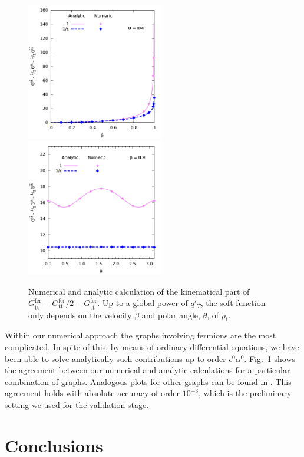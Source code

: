 \documentclass{appolb}
\newcommand{\ttb}{\text{t} \bar{\text{t}} }
\newcommand{\txt}{\text{t} }
\newcommand{\txtb}{\bar{\text{t}} }
\begin{document}
\begin{figure}[ht!]
\centerline{
%
\includegraphics[width=6cm]{bubble-beta34rene.png}
\includegraphics[width=6cm]{bubble-theta34rene.png}
}
\caption{Numerical and analytic calculation of the kinematical part of 
$G^\text{fer}_{\ttb}- G^\text{fer}_{\txt\txt} /2- G^\text{fer}_{\txtb \txtb}$. Up to a global power of $q'_T$, the soft function only depends on the velocity $\beta$ and polar angle, $\theta$, of $p_\txt$.}
\label{fig:results}
\end{figure}

Within our numerical approach the graphs involving fermions are the most complicated. In spite of this, by means of  ordinary differential equations, we have been able to solve analytically such contributions up to order $\epsilon^0 \alpha^0$. Fig.~\ref{fig:results} shows the agreement between our numerical and analytic calculations for a particular combination of graphs. Analogous plots for other graphs can be found in \cite{sapeta}. This agreement holds with  absolute accuracy of order $10^{-3}$, which is the preliminary setting we used for the validation stage. 

\section{Conclusions}
\end{document}
